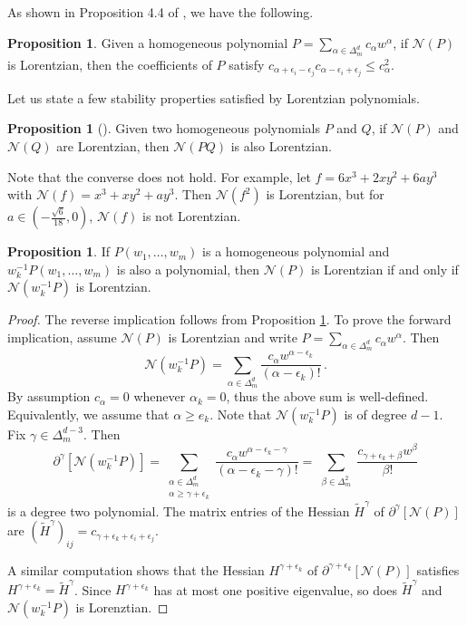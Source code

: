 \documentclass[12pt,reqno]{amsart}
\theoremstyle{definition}
\newtheorem{proposition}[theorem]{Proposition}
\def\a{\alpha}
\def\b{\beta}
\def\g{\gamma}
\def\e{\epsilon}
\def\normal{\mathcal{N}}
\begin{document}
As shown in Proposition 4.4 of \cite{branden2020lorentzian}, we have the following.

\begin{proposition}\label{prop:LorentzianImpliesUltraLogConcavity}
Given a homogeneous polynomial $P=\sum\limits_{\alpha \in \Delta_{m}^{d}} c_{\alpha}w^{\alpha}$, if $\normal(P)$ is Lorentzian, then the coefficients of $P$ satisfy
$c_{\alpha+\epsilon_{i}-\epsilon_{j}}c_{\alpha-\epsilon_{i}+\epsilon_{j}}\leq c_{\alpha}^{2} $.
\end{proposition}

Let us state a few stability properties satisfied by Lorentzian polynomials.

\begin{proposition}[{\cite[Corollary~3.8]{branden2020lorentzian}}]\label{lorentzproduct}
Given two homogeneous polynomials $P$ and $Q$, if $\normal(P)$ and $\normal(Q)$ are Lorentzian, then $\normal(PQ)$ is also Lorentzian.
\end{proposition}

Note that the converse does not hold. For example, let $f = 6x^3 + 2xy^2+6ay^3$ with $\normal(f)=x^3+xy^2+ay^3$. Then $\normal(f^2)$ is Lorentzian, but for $a\in (-\frac{\sqrt{6}}{18}, 0)$, $\normal(f)$ is not Lorentzian.

\begin{proposition}\label{prop.LaurentShift}
    If $P(w_1,\dots, w_m)$ is a homogeneous polynomial and $w_k^{-1}P(w_1,\dots, w_m)$ is also a polynomial, then $\normal(P)$ is Lorentzian if and only if $\normal(w_k^{-1}P)$ is Lorentzian.
\end{proposition}
\begin{proof}
    The reverse implication follows from Proposition \ref{lorentzproduct}. To prove the forward implication, assume $\normal(P)$ is Lorentzian and write $P=\sum\limits_{\alpha \in \Delta_{m}^{d}} c_{\alpha}w^{\alpha}$. Then 
    \[
    \normal(w_k^{-1}P)=
    \sum\limits_{\alpha \in \Delta_{m}^{d}} \frac{c_{\alpha}w^{\alpha-\e_k}}{(\a-\e_k) !}\,.
    \]
    By assumption $c_\a=0$ whenever $\a_k=0$, thus the above sum is well-defined. Equivalently, we assume that $\a\geq e_k$. Note that $\normal(w_k^{-1}P)$ is of degree $d-1$. Fix $\g\in \Delta_m^{d-3}$. Then 
    \[
    {\partial^\g}
    [\normal(w_k^{-1}P)]
    =
    \sum\limits_{\substack{\alpha \in \Delta_{m}^{d}\\\a\geq\g+\e_k}} \frac{c_{\alpha}w^{\alpha-\e_k-\g}}{(\a-\e_k-\g) !}
    =
    \sum\limits_{\substack{\b \in \Delta_{m}^{2}}} \frac{c_{\g+\e_k+\b}w^{\b}}{\b!}
    \]
    is a degree two polynomial. The matrix entries of the Hessian $\tilde H^\g$ of ${\partial^\g}
    [\normal(P)]$ are $(\tilde H^\g)_{ij}=c_{\g+\e_k+\e_i+\e_j}$.

    A similar computation shows that the Hessian $H^{\g+\e_k}$ of $\partial^{\g+\e_k}[\normal(P)]$ satisfies $H^{\g+\e_k}=\tilde H^\g$. Since $H^{\g+\e_k}$ has at most one positive eigenvalue, so does $\tilde H^\g$ and $\normal(w_k^{-1}P)$ is Lorenztian.
\end{proof}
\end{document}
